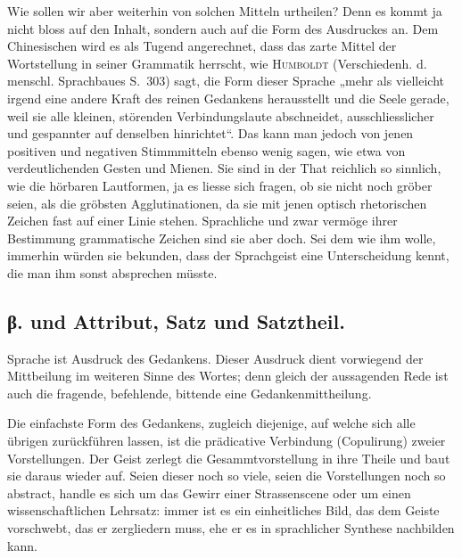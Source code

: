 Wie sollen wir aber weiterhin von solchen Mitteln urtheilen? Denn es kommt ja nicht bloss auf den Inhalt, sondern auch auf die Form des Ausdruckes an. Dem Chinesischen wird es als Tugend angerechnet, dass \label{fp.431} das zarte Mittel der Wortstellung in seiner Grammatik herrscht,  wie \textsc{Humboldt} (Verschiedenh. d. menschl. Sprachbaues S.~303) sagt, die Form dieser Sprache „mehr als vielleicht irgend eine andere  Kraft des reinen Gedankens herausstellt und die Seele gerade, weil sie alle kleinen, störenden Verbindungslaute abschneidet, ausschliesslicher und gespannter auf denselben hinrichtet“. Das kann man jedoch von jenen positiven und negativen Stimmmitteln ebenso wenig sagen, wie etwa von verdeutlichenden Gesten und Mienen. Sie sind in der That reichlich so sinnlich, wie die hörbaren Lautformen, ja es liesse sich fragen, ob sie nicht noch gröber seien, als die gröbsten Agglutinationen, da sie mit jenen optisch rhetorischen Zeichen fast auf einer Linie stehen. Sprachliche und zwar vermöge ihrer Bestimmung grammatische Zeichen sind sie aber doch. Sei dem wie ihm wolle, immerhin würden sie bekunden, dass der Sprachgeist eine Unterscheidung kennt, die man ihm sonst absprechen müsste. 

\subsection*{β.  und Attribut, Satz und Satztheil.}\label{IV.IV.Icbeta}

Sprache ist Ausdruck des Gedankens. Dieser Ausdruck dient vorwiegend der Mittbeilung im weiteren Sinne des Wortes; denn gleich der aussagenden Rede ist auch die fragende, befehlende, bittende eine Gedankenmittheilung.

Die einfachste Form des Gedankens, zugleich diejenige, auf welche sich alle übrigen zurückführen lassen, ist die prädicative Verbindung (Copulirung) zweier Vorstellungen. Der Geist zerlegt die Gesammtvorstellung in ihre Theile und baut sie daraus wieder auf. Seien dieser noch so viele, seien die Vorstellungen noch so abstract, handle es sich um das Gewirr einer Strassenscene oder um einen wissenschaftlichen Lehrsatz: immer ist es ein einheitliches Bild, \label{sp.452} das dem Geiste vorschwebt, das er zergliedern muss, ehe er es in sprachlicher Synthese nachbilden kann.

